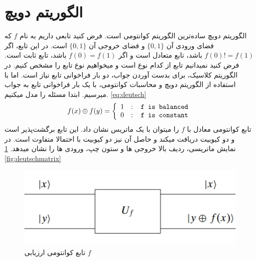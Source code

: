 \section{الگوریتم دویچ}
الگوریتم دویچ
ساده‌ترین الگوریتم کوانتومی است. فرض کنید تابعی داریم به نام $f$ که فضای ورودی آن $\{0, 1\}$ و فضای خروجی آن $\{0, 1\}$ است. در این تابع، اگر $f(0) != f(1)$ باشد، تابع متعادل است و اگر $f(0) = f(1)$ باشد، تابع ثابت است.
فرض کنید نمیدانیم تابع از کدام نوع است و میخواهیم نوع تابع را مشخص کنیم. در الگوریتم کلاسیک، برای بدست آوردن جواب، دو بار فراخوانی تابع نیاز است. اما با استفاده از الگوریتم دویچ و محاسبات کوانتومی، با یک بار فراخوانی تابع به جواب میرسیم. ابتدا مسئله را مدل میکنیم.
\ref{eq:deutsch}
\begin{equation} \label{eq:deutsch}
f(x)  \oplus f(y) = \left\{ \begin{array}{cl}
1 & : \ \verb; f is balanced; \\
0 & : \ \verb; f is constant;
\end{array} \right.
\end{equation}
تابع کوانتومی معادل با $f$ را میتوان با یک ماتریس نشان داد. این تابع برگشت‌پذیر است و دو کیوبیت دریافت میکند و حاصل آن نیز دو کیوبیت با احتمالا متفاوت است. در نمایش ماتریسی، ردیف بالا خروجی ها و ستون چپ، ورودی ها را نشان میدهد.
\ref{fig:deutschunitery}
\ref{fig:deutschmatrix}
\begin{figure}[!h]
\centerline{\includegraphics[width=.5\textwidth]{deutschunitery.jpeg}}
\caption{تابع کوانتومی ارزیابی $f$}
\label{fig:deutschunitery}
\end{figure}

